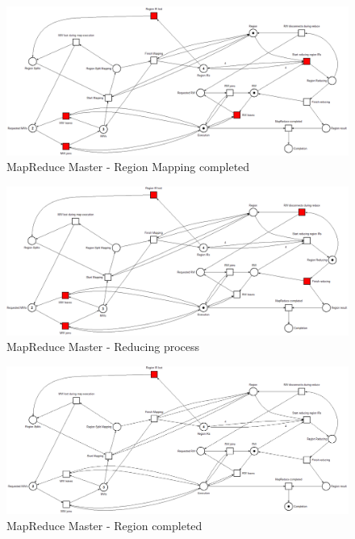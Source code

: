 \begin{figure}[!ht]
    \centering
    \includegraphics[width=\linewidth]{document/chapters/chapter_6/images/master_petri_net_3.png}
    \caption{MapReduce Master - Region Mapping completed}
    \label{fig:master_petri_net_3}
\end{figure}

\begin{figure}[!ht]
    \centering
    \includegraphics[width=\linewidth]{document/chapters/chapter_6/images/master_petri_net_4.png}
    \caption{MapReduce Master - Reducing process}
    \label{fig:master_petri_net_4}
\end{figure}

\begin{figure}[!ht]
    \centering
    \includegraphics[width=\linewidth]{document/chapters/chapter_6/images/master_petri_net_5.png}
    \caption{MapReduce Master - Region completed}
    \label{fig:master_petri_net_5}
\end{figure}